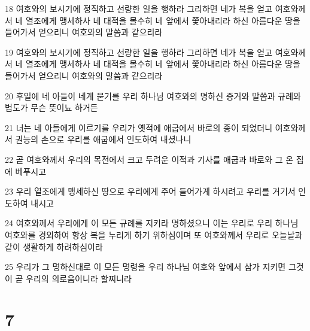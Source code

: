 \par 18 여호와의 보시기에 정직하고 선량한 일을 행하라 그리하면 네가 복을 얻고 여호와께서 네 열조에게 맹세하사 네 대적을 몰수히 네 앞에서 쫓아내리라 하신 아름다운 땅을 들어가서 얻으리니 여호와의 말씀과 같으리라
\par 19 여호와의 보시기에 정직하고 선량한 일을 행하라 그리하면 네가 복을 얻고 여호와께서 네 열조에게 맹세하사 네 대적을 몰수히 네 앞에서 쫓아내리라 하신 아름다운 땅을 들어가서 얻으리니 여호와의 말씀과 같으리라
\par 20 후일에 네 아들이 네게 묻기를 우리 하나님 여호와의 명하신 증거와 말씀과 규례와 법도가 무슨 뜻이뇨 하거든
\par 21 너는 네 아들에게 이르기를 우리가 옛적에 애굽에서 바로의 종이 되었더니 여호와께서 권능의 손으로 우리를 애굽에서 인도하여 내셨나니
\par 22 곧 여호와께서 우리의 목전에서 크고 두려운 이적과 기사를 애굽과 바로와 그 온 집에 베푸시고
\par 23 우리 열조에게 맹세하신 땅으로 우리에게 주어 들어가게 하시려고 우리를 거기서 인도하여 내시고
\par 24 여호와께서 우리에게 이 모든 규례를 지키라 명하셨으니 이는 우리로 우리 하나님 여호와를 경외하여 항상 복을 누리게 하기 위하심이며 또 여호와께서 우리로 오늘날과 같이 생활하게 하려하심이라
\par 25 우리가 그 명하신대로 이 모든 명령을 우리 하나님 여호와 앞에서 삼가 지키면 그것이 곧 우리의 의로움이니라 할찌니라

\chapter{7}

